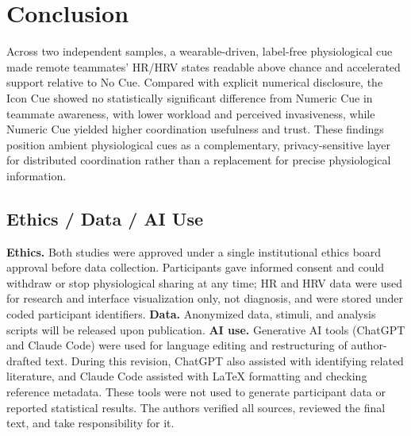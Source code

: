 \documentclass[sigconf]{acmart}
\begin{document}
\section{Conclusion}
Across two independent samples, a wearable-driven, label-free physiological cue made remote teammates' HR/HRV states readable above chance and accelerated support relative to No Cue. Compared with explicit numerical disclosure, the Icon Cue showed no statistically significant difference from Numeric Cue in teammate awareness, with lower workload and perceived invasiveness, while Numeric Cue yielded higher coordination usefulness and trust. These findings position ambient physiological cues as a complementary, privacy-sensitive layer for distributed coordination rather than a replacement for precise physiological information.

\subsection{Ethics / Data / AI Use}
\textbf{Ethics.} Both studies were approved under a single institutional ethics board approval before data collection. Participants gave informed consent and could withdraw or stop physiological sharing at any time; HR and HRV data were used for research and interface visualization only, not diagnosis, and were stored under coded participant identifiers. \textbf{Data.} Anonymized data, stimuli, and analysis scripts will be released upon publication. \textbf{AI use.} Generative AI tools (ChatGPT and Claude Code) were used for language editing and restructuring of author-drafted text. During this revision, ChatGPT also assisted with identifying related literature, and Claude Code assisted with LaTeX formatting and checking reference metadata. These tools were not used to generate participant data or reported statistical results. The authors verified all sources, reviewed the final text, and take responsibility for it.

\clearpage


\end{document}
